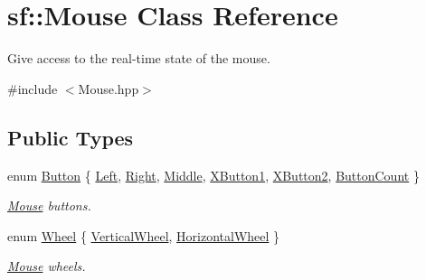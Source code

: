 \hypertarget{classsf_1_1_mouse}{}\section{sf\+:\+:Mouse Class Reference}
\label{classsf_1_1_mouse}


Give access to the real-\/time state of the mouse.  




{\ttfamily \#include $<$Mouse.\+hpp$>$}

\subsection*{Public Types}
\begin{DoxyCompactItemize}
\item 
enum \hyperlink{classsf_1_1_mouse_a4fb128be433f9aafe66bc0c605daaa90}{Button} \{ \newline
\hyperlink{classsf_1_1_mouse_a4fb128be433f9aafe66bc0c605daaa90a8bb4856e1ec7f6b6a8605effdfc0eee8}{Left}, 
\hyperlink{classsf_1_1_mouse_a4fb128be433f9aafe66bc0c605daaa90af2cff24ab6c26daf079b11189f982fc4}{Right}, 
\hyperlink{classsf_1_1_mouse_a4fb128be433f9aafe66bc0c605daaa90a2c353189c4b11cf216d7caddafcc609d}{Middle}, 
\hyperlink{classsf_1_1_mouse_a4fb128be433f9aafe66bc0c605daaa90aecc7f3ce9ad6a60b9b0027876446b8d7}{X\+Button1}, 
\newline
\hyperlink{classsf_1_1_mouse_a4fb128be433f9aafe66bc0c605daaa90a03fa056fd0dd9d629c205d91a8ef1b5a}{X\+Button2}, 
\hyperlink{classsf_1_1_mouse_a4fb128be433f9aafe66bc0c605daaa90a52a1d434289774240ddaa22496762402}{Button\+Count}
 \}\begin{DoxyCompactList}\small\item\em \hyperlink{classsf_1_1_mouse}{Mouse} buttons. \end{DoxyCompactList}
\item 
enum \hyperlink{classsf_1_1_mouse_a60dd479a43f26f200e7957aa11803ff4}{Wheel} \{ \hyperlink{classsf_1_1_mouse_a60dd479a43f26f200e7957aa11803ff4abd571de908d2b2c4b9f165f29c678496}{Vertical\+Wheel}, 
\hyperlink{classsf_1_1_mouse_a60dd479a43f26f200e7957aa11803ff4a785768d5e33c77de9fdcfdd02219f4e2}{Horizontal\+Wheel}
 \}\begin{DoxyCompactList}\small\item\em \hyperlink{classsf_1_1_mouse}{Mouse} wheels. \end{DoxyCompactList}
\end{DoxyCompactItemize}
